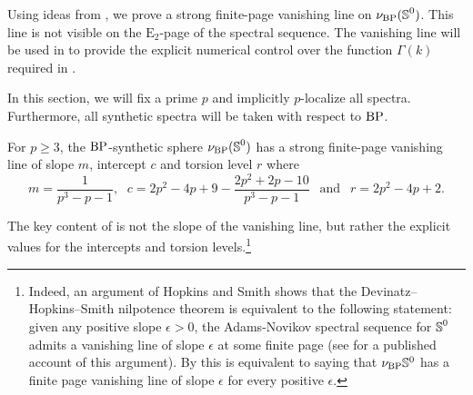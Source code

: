 Using ideas from , we prove a strong finite-page vanishing line on $\nu_{\mathrm{BP}}(\operatorname{\mathbb{S}}^0)$. This line is not visible on the $\mathrm{E}_2$-page of the spectral sequence. The vanishing line will be used in  to provide the explicit numerical control over the function $\Gamma (k)$ required in .

\begin{cnv}
    In this section, we will fix a prime $p$ and implicitly $p$-localize all spectra. Furthermore, all synthetic spectra will be taken with respect to $\mathrm{BP}$.
\end{cnv}

\begin{thm}
  \label{thm:AN-vl}
  For $p\geq 3$, the $\mathrm{BP}$-synthetic sphere $\nu_{\mathrm{BP}} (\operatorname{\mathbb{S}}^{0})$ has a strong finite-page vanishing line of slope $m$, intercept $c$ and torsion level $r$ where
  $$ m = \frac{1}{p^3 - p -1} \text{, }\ \ c = 2p^2 - 4p + 9 - \frac{2p^2+2p-10}{p^3 - p -1}\ \ \text{   and   }\ \  r = 2p^2-4p+2. $$
\end{thm}

\begin{rmk}
  The key content of  is not the slope of the vanishing line,
  but rather the explicit values for the intercepts and torsion levels.\footnote{Indeed, an argument of Hopkins and Smith shows that the Devinatz--Hopkins--Smith nilpotence theorem is equivalent to the following statement:
  given any positive slope $\epsilon > 0$,
  the Adams-Novikov spectral sequence for $\operatorname{\mathbb{S}}^0$ admits a vanishing line of slope $\epsilon$
  at some finite page (see \cite[Theorem 3.30]{Akhil} for a published account of this argument).
  By  this is equivalent to saying that $\nu_{\mathrm{BP}} \mathbb{S}^0$ has a finite page vanishing line of slope $\epsilon$ for every positive $\epsilon$.}
\end{rmk}


